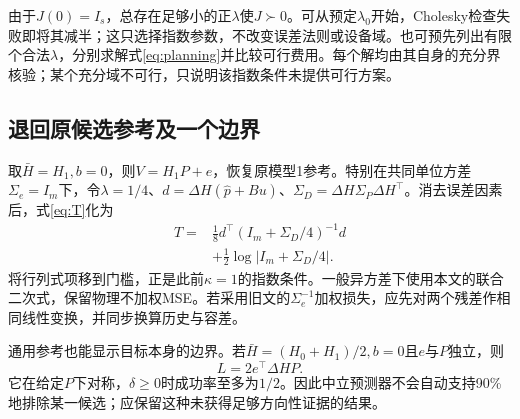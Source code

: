 \documentclass[journal,10pt]{IEEEtran}
\begin{document}
由于$J(0)=I_s$，总存在足够小的正$\lambda$使$J\succ0$。可从预定$\lambda_0$开始，Cholesky检查失败即将其减半；这只选择指数参数，不改变误差法则或设备域。也可预先列出有限个合法$\lambda$，分别求解式\eqref{eq:planning}并比较可行费用。每个解均由其自身的充分界核验；某个充分域不可行，只说明该指数条件未提供可行方案。

\subsection{退回原候选参考及一个边界}
取$\bar H=H_1,b=0$，则$V=H_1P+e$，恢复原模型1参考。特别在共同单位方差$\Sigma_e=I_m$下，令$\lambda=1/4$、$d=\Delta H(\widehat p+Bu)$、$\Sigma_D=\Delta H\Sigma_P\Delta H^\top$。消去误差因素后，式\eqref{eq:T}化为
\begin{equation}
\begin{split}
T={}&\tfrac18d^\top(I_m+\Sigma_D/4)^{-1}d\\
&+\tfrac12\log|I_m+\Sigma_D/4|.
\end{split} \label{eq:old}
\end{equation}
将行列式项移到门槛，正是此前$\kappa=1$的指数条件。一般异方差下使用本文的联合二次式，保留物理不加权MSE。若采用旧文的$\Sigma_e^{-1}$加权损失，应先对两个残差作相同线性变换，并同步换算历史与容差。

通用参考也能显示目标本身的边界。若$\bar H=(H_0+H_1)/2,b=0$且$e$与$P$独立，则
\[
L=2e^\top\Delta HP.
\]
它在给定$P$下对称，$\delta\ge0$时成功率至多为$1/2$。因此中立预测器不会自动支持90\%地排除某一候选；应保留这种未获得足够方向性证据的结果。
\end{document}
